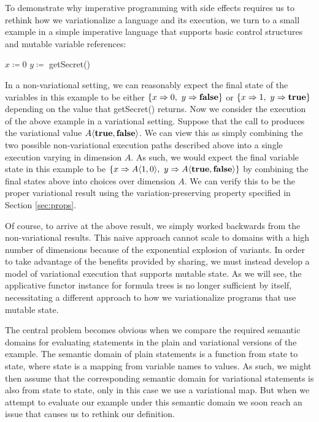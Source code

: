 \documentclass[12pt,oneside]{book}
\begin{document}
To demonstrate why imperative programming with side effects requires us to rethink how we
variationalize a language and its execution, we turn to a small example in a simple imperative
language that supports basic control structures and mutable variable references:

\begin{samepage}
\begin{algorithmic}
\STATE $x \coloneqq 0$
\STATE $y \coloneqq$ getSecret()
\ENDIF
\end{algorithmic}
\end{samepage}

In a non-variational setting, we can reasonably expect the final state of the variables in this example
to be either $\{x \Rightarrow 0,\ y \Rightarrow \textbf{\textup{\textrm{false}}}\}$ or
$\{x \Rightarrow 1,\ y \Rightarrow \textbf{\textup{\textrm{true}}}\}$ depending on the value that
getSecret() returns. Now we consider the execution of the above example in a variational
setting. Suppose that the call to 
produces the variational value $A \langle \textbf{\textup{\textrm{true}}}, \textbf{\textup{\textrm{false}}} \rangle$. We can view this as simply
combining the two possible non-variational execution paths described above into a
single execution varying in dimension $A$. As such, we would expect the final variable state
in this example to be  $\{x \Rightarrow A \langle 1, 0 \rangle,\ y \Rightarrow A \langle \textbf{\textup{\textrm{true}}}, \textbf{\textup{\textrm{false}}} \rangle\}$ by combining the final states above into choices over dimension $A$. We can verify this to be the proper variational result using the variation-preserving property
specified in Section \ref{sec:props}.

Of course, to arrive at the above result, we simply worked backwards from the non-variational
results. This naive approach cannot scale to domains with a high number of dimensions because of the exponential
explosion of variants. In order to take advantage of the benefits provided by sharing, we must instead develop a model
of variational execution that supports mutable state.  As we will see, the applicative functor instance for
formula trees is no longer sufficient by itself, necessitating a different approach to how we variationalize programs
that use mutable state.

The central problem becomes obvious when we compare the required semantic domains for evaluating statements
in the plain and variational versions of the example. The semantic domain of plain statements is a function from state to
state, where state is a mapping from variable names to values. As such, we might then assume that the corresponding
semantic domain for variational statements is also from state to state, only in this case we use a variational map. But when
we attempt to evaluate our example under this semantic domain we soon reach an issue that causes us to rethink our definition.
\end{document}
